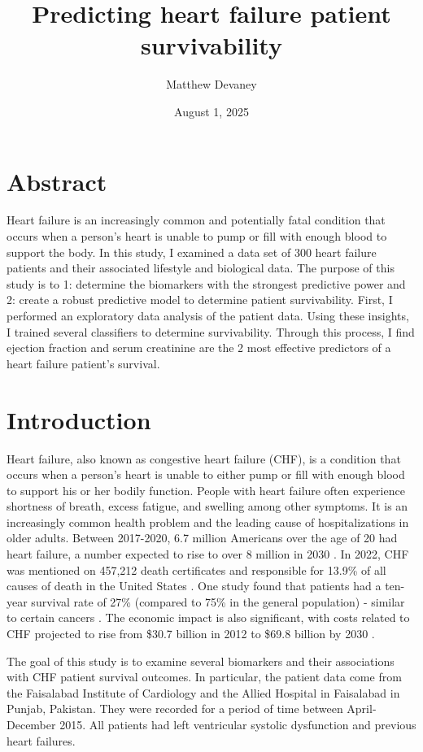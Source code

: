 \documentclass[12pt, letterpaper]{article}
\title{Predicting heart failure patient survivability}
\author{Matthew Devaney}
\date{August 1, 2025}
\begin{document}
	\maketitle
	\onehalfspacing
	\section*{Abstract}
	
	Heart failure is an increasingly common and potentially fatal condition that occurs when a person's heart is unable to pump or fill with enough blood to support the body. In this study, I examined a data set of 300 heart failure patients and their associated lifestyle and biological data. The purpose of this study is to 1: determine the biomarkers with the strongest predictive power and 2: create a robust predictive model to determine patient survivability. First, I performed an exploratory data analysis of the patient data. Using these insights, I trained several classifiers to determine survivability. Through this process, I find ejection fraction and serum creatinine are the 2 most effective predictors of a heart failure patient's survival. 
	
	\section{Introduction}
	
	Heart failure, also known as congestive heart failure (CHF), is a condition that occurs when a person's heart is unable to either pump or fill with enough blood to support his or her bodily function. People with heart failure often experience shortness of breath, excess fatigue, and swelling among other symptoms. It is an increasingly common health problem and the leading cause of hospitalizations in older adults. Between 2017-2020, 6.7 million Americans over the age of 20 had heart failure, a number expected to rise to over 8 million in 2030 \cite{hf_info}. In 2022, CHF was mentioned on 457,212 death certificates and responsible for 13.9\% of all causes of death in the United States \cite{cdcAboutHeart}. One study found that patients had a ten-year survival rate of 27\% (compared to 75\% in the general population) - similar to certain cancers \cite{nihChronicHeart}. The economic impact is also significant, with costs related to CHF projected to rise from \$30.7 billion in 2012 to \$69.8 billion by 2030 \cite{hf_info}.
	
	The goal of this study is to examine several biomarkers and their associations with CHF patient survival outcomes. In particular, the patient data come from the Faisalabad Institute of Cardiology and the Allied Hospital in Faisalabad in Punjab, Pakistan. They were recorded for a period of time between April-December 2015. All patients had left ventricular systolic dysfunction and previous heart failures.
	
\end{document}
